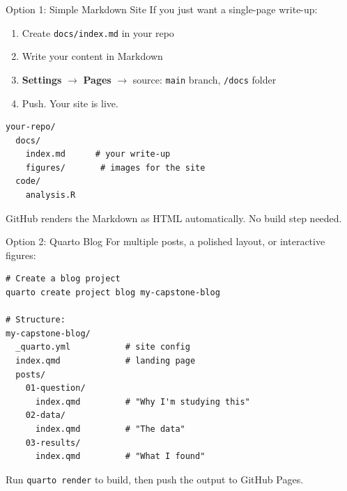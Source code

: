 \begin{frame}[fragile]{Option 1: Simple Markdown Site}
  \small
  If you just want a single-page write-up:

  \vspace{2pt}

  \begin{enumerate}\setlength\itemsep{0pt}
    \item Create \texttt{docs/index.md} in your repo
    \item Write your content in Markdown
    \item \textbf{Settings} $\to$ \textbf{Pages} $\to$ source: \texttt{main} branch, \texttt{/docs} folder
    \item Push. Your site is live.
  \end{enumerate}

  \vspace{4pt}

  \begin{lstlisting}[style=terminal,basicstyle=\ttfamily\scriptsize]
your-repo/
  docs/
    index.md      # your write-up
    figures/       # images for the site
  code/
    analysis.R
  \end{lstlisting}

  \vspace{2pt}

  GitHub renders the Markdown as HTML automatically. No build step needed.
\end{frame}

\begin{frame}[fragile]{Option 2: Quarto Blog}
  \small
  For multiple posts, a polished layout, or interactive figures:

  \vspace{2pt}

  \begin{lstlisting}[style=terminal,basicstyle=\ttfamily\scriptsize]
# Create a blog project
quarto create project blog my-capstone-blog

# Structure:
my-capstone-blog/
  _quarto.yml           # site config
  index.qmd             # landing page
  posts/
    01-question/
      index.qmd         # "Why I'm studying this"
    02-data/
      index.qmd         # "The data"
    03-results/
      index.qmd         # "What I found"
  \end{lstlisting}

  \vspace{2pt}

  Run \texttt{quarto render} to build, then push the output to GitHub Pages.
\end{frame}

